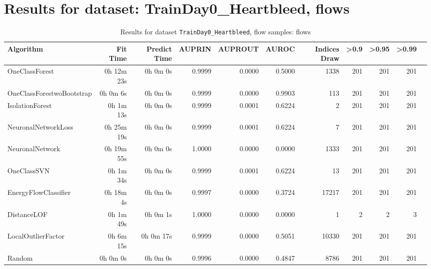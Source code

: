 \documentclass{article}
\begin{document}
\section*{Results for dataset: TrainDay0_Heartbleed, flows}
\begin{table}[h!]
\centering
\caption{Results for dataset \texttt{TrainDay0_Heartbleed}, flow samples: flows}
\label{tab:trainday0heartbleed_flows}
\begin{tabular}{lrrrrrrrrrr}
\toprule
Algorithm & Fit Time & Predict Time & AUPRIN & AUPROUT & AUROC & Indices Draw & >0.9 & >0.95 & >0.99 \\
\midrule
OneClassForest & 0h 12m 23s & 0h 0m 0s & 0.9999 & 0.0000 & 0.5000 & 1338 & 201 & 201 & 201 \\
OneClassForestwoBootstrap & 0h 0m 6s & 0h 0m 0s & 0.9999 & 0.0000 & 0.9903 & 113 & 201 & 201 & 201 \\
IsolationForest & 0h 1m 13s & 0h 0m 0s & 0.9999 & 0.0001 & 0.6224 & 2 & 201 & 201 & 201 \\
NeuronalNetworkLoss & 0h 25m 19s & 0h 0m 0s & 0.9999 & 0.0001 & 0.6224 & 7 & 201 & 201 & 201 \\
NeuronalNetwork & 0h 19m 55s & 0h 0m 0s & 1.0000 & 0.0000 & 0.0000 & 1333 & 201 & 201 & 201 \\
OneClassSVN & 0h 1m 34s & 0h 0m 0s & 0.9999 & 0.0001 & 0.6224 & 13 & 201 & 201 & 201 \\
EnergyFlowClassifier & 0h 18m 4s & 0h 0m 0s & 0.9997 & 0.0000 & 0.3724 & 17217 & 201 & 201 & 201 \\
DistanceLOF & 0h 1m 49s & 0h 0m 1s & 1.0000 & 0.0000 & 0.0000 & 1 & 2 & 2 & 3 \\
LocalOutlierFactor & 0h 6m 15s & 0h 0m 17s & 0.9999 & 0.0000 & 0.5051 & 10330 & 201 & 201 & 201 \\
Random & 0h 0m 0s & 0h 0m 0s & 0.9996 & 0.0000 & 0.4847 & 8786 & 201 & 201 & 201 \\
\bottomrule
\end{tabular}
\end{table}
\end{document}
